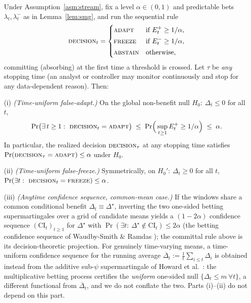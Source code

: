 \begin{theorem}\label{thm:anytime}
Under Assumption~\ref{asm:stream}, fix a level $\alpha\in(0,1)$ and predictable
bets $\lambda_t,\lambda_t^{-}$ as in Lemma~\ref{lem:smg}, and run the sequential rule
\[
\textsc{decision}_t=
\begin{cases}
\textsc{adapt}  & \text{if } E_t^{+}\ge 1/\alpha,\\[2pt]
\textsc{freeze} & \text{if } E_t^{-}\ge 1/\alpha,\\[2pt]
\textsc{abstain}& \text{otherwise,}
\end{cases}
\]
committing (absorbing) at the first time a threshold is crossed. Let
$\tau$ be \emph{any} stopping time (an analyst or controller may monitor
continuously and stop for any data-dependent reason). Then:

\textnormal{(i)} \emph{(Time-uniform false-adapt.)} On the global non-benefit
null $H_0:\ \Delta_t\le0$ for all $t$,
\[
   \Pr\!\big(\exists\,t\ge1:\ \textsc{decision}_t=\textsc{adapt}\big)
   \;\le\;\Pr\!\Big(\sup_{t\ge1} E_t^{+}\ge 1/\alpha\Big)\;\le\;\alpha .
\]
In particular, the realized decision $\textsc{decision}_\tau$ at any stopping time
satisfies $\Pr(\textsc{decision}_\tau=\textsc{adapt})\le\alpha$ under $H_0$.

\textnormal{(ii)} \emph{(Time-uniform false-freeze.)} Symmetrically, on
$H_0':\ \Delta_t\ge0$ for all $t$,
$\Pr(\exists t:\ \textsc{decision}_t=\textsc{freeze})\le\alpha$.

\textnormal{(iii)} \emph{(Anytime confidence sequence, common-mean case.)}
If the windows share a common conditional benefit $\Delta_t\equiv\Delta^\star$,
inverting the two one-sided betting supermartingales over a grid of candidate
means yields a $(1-2\alpha)$ confidence sequence $(\mathrm{CI}_t)_{t\ge1}$ for
$\Delta^\star$ with $\Pr(\exists t:\ \Delta^\star\notin\mathrm{CI}_t)\le2\alpha$
(the betting confidence sequence of Waudby-Smith \& Ramdas
\cite{waudbysmith2024betting}); the committal rule above is its
decision-theoretic projection. For genuinely time-varying means, a time-uniform
confidence sequence for the running average
$\overline{\Delta}_t:=\frac1t\sum_{i\le t}\Delta_i$ is obtained instead from the
additive sub-$\psi$ supermartingale of Howard et al.~\cite{howard2021timeuniform}:
the multiplicative betting process certifies the \emph{uniform} one-sided null
$\{\Delta_t\le m\ \forall t\}$, a different functional from $\overline{\Delta}_t$,
and we do not conflate the two. Parts \textnormal{(i)--(ii)} do not depend on this part.


\end{theorem}
